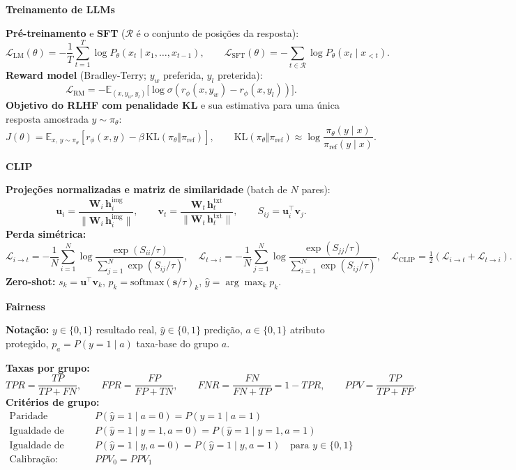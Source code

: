 \documentclass[11pt,a4paper]{article}
\newcommand{\bloco}[1]{%
  \par\vspace{0.3em}%
  {\bfseries\large #1}\par%
  \vspace{-0.4em}{\color{gray!60}\rule{\linewidth}{0.4pt}}\par%
}
\begin{document}
\bloco{Treinamento de LLMs}

\textbf{Pré-treinamento} e \textbf{SFT} ($\mathcal{R}$ é o conjunto de posições da resposta):
\[
  \mathcal{L}_{\text{LM}}(\theta) = -\frac{1}{T}\sum_{t=1}^{T} \log P_\theta(x_t \mid x_1, \ldots, x_{t-1}),
  \qquad
  \mathcal{L}_{\text{SFT}}(\theta) = -\sum_{t \in \mathcal{R}} \log P_\theta(x_t \mid x_{<t}).
\]
\textbf{Reward model} (Bradley-Terry; $y_w$ preferida, $y_l$ preterida):
\[
  \mathcal{L}_{\text{RM}} = -\mathbb{E}_{(x,y_w,y_l)}\big[\log \sigma\!\left(r_\phi(x,y_w) - r_\phi(x,y_l)\right)\big].
\]
\textbf{Objetivo do RLHF com penalidade KL} e sua estimativa para uma única resposta amostrada $y \sim \pi_\theta$:
\[
  J(\theta) = \mathbb{E}_{x,\,y\sim\pi_\theta}\!\left[ r_\phi(x,y) - \beta\, \text{KL}\!\left(\pi_\theta \Vert \pi_{\text{ref}}\right) \right],
  \qquad
  \text{KL}\!\left(\pi_\theta \Vert \pi_{\text{ref}}\right) \approx \log\frac{\pi_\theta(y \mid x)}{\pi_{\text{ref}}(y \mid x)}.
\]

\bloco{CLIP}

\textbf{Projeções normalizadas e matriz de similaridade} (batch de $N$ pares):
\[
  \mathbf{u}_i = \frac{\mathbf{W}_i\, \mathbf{h}_i^{\text{img}}}{\|\mathbf{W}_i\, \mathbf{h}_i^{\text{img}}\|},
  \qquad
  \mathbf{v}_t = \frac{\mathbf{W}_t\, \mathbf{h}_t^{\text{txt}}}{\|\mathbf{W}_t\, \mathbf{h}_t^{\text{txt}}\|},
  \qquad
  S_{ij} = \mathbf{u}_i^{\top}\mathbf{v}_j.
\]
\textbf{Perda simétrica:}
\[
  \mathcal{L}_{i\to t} = -\frac{1}{N}\sum_{i=1}^{N} \log\frac{\exp(S_{ii}/\tau)}{\sum_{j=1}^{N}\exp(S_{ij}/\tau)},
  \quad
  \mathcal{L}_{t\to i} = -\frac{1}{N}\sum_{j=1}^{N} \log\frac{\exp(S_{jj}/\tau)}{\sum_{i=1}^{N}\exp(S_{ij}/\tau)},
  \quad
  \mathcal{L}_{\text{CLIP}} = \tfrac{1}{2}\left(\mathcal{L}_{i\to t} + \mathcal{L}_{t\to i}\right).
\]
\textbf{Zero-shot:} $s_k = \mathbf{u}^{\top}\mathbf{v}_k$, \quad $p_k = \mathrm{softmax}(\mathbf{s}/\tau)_k$, \quad $\hat{y} = \arg\max_k p_k$.

\bloco{Fairness}

\textbf{Notação:} $y \in \{0,1\}$ resultado real, $\hat{y} \in \{0,1\}$ predição, $a \in \{0,1\}$ atributo protegido, $p_a = P(y{=}1 \mid a)$ taxa-base do grupo $a$.

\textbf{Taxas por grupo:}
\[
  TPR = \frac{TP}{TP+FN}, \qquad
  FPR = \frac{FP}{FP+TN}, \qquad
  FNR = \frac{FN}{FN+TP} = 1 - TPR, \qquad
  PPV = \frac{TP}{TP+FP}.
\]
\textbf{Critérios de grupo:}
\begin{align*}
  \text{Paridade demográfica:}\quad & P(\hat{y}{=}1 \mid a{=}0) = P(\hat{y}{=}1 \mid a{=}1) \\
  \text{Igualdade de oportunidade:}\quad & P(\hat{y}{=}1 \mid y{=}1, a{=}0) = P(\hat{y}{=}1 \mid y{=}1, a{=}1) \\
  \text{Igualdade de chances:}\quad & P(\hat{y}{=}1 \mid y, a{=}0) = P(\hat{y}{=}1 \mid y, a{=}1) \quad \text{para } y \in \{0, 1\} \\
  \text{Calibração:}\quad & PPV_0 = PPV_1
\end{align*}
\end{document}
